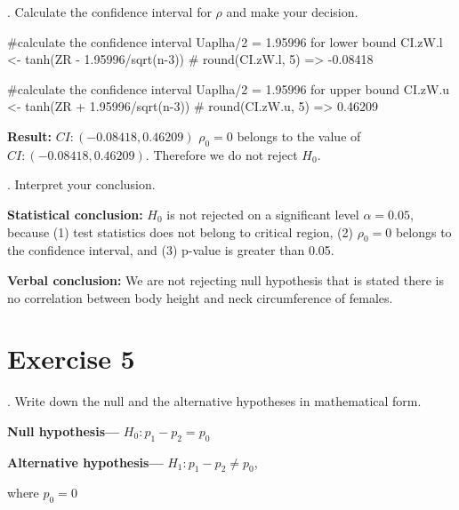 \documentclass[12pt, oneside]{report}\usepackage[]{graphicx}\usepackage[]{color}
\begin{document}
. Calculate the confidence interval for $\rho$ and make your decision.
\begin{Schunk}
\begin{Sinput}
#calculate the confidence interval Uaplha/2 = 1.95996 for lower bound
CI.zW.l <- tanh(ZR - 1.95996/sqrt(n-3))
# round(CI.zW.l, 5) => -0.08418

#calculate the confidence interval Uaplha/2 = 1.95996 for upper bound
CI.zW.u <- tanh(ZR + 1.95996/sqrt(n-3))
# round(CI.zW.u, 5) => 0.46209
\end{Sinput}
\end{Schunk}
{\bf Result:} $CI: (-0.08418, 0.46209)$ \newline
$\rho_0 = 0$ belongs to the value of $CI: (-0.08418, 0.46209)$. Therefore we do not reject $H_0$. \newline

. Interpret your conclusion. \newline

{\bf Statistical conclusion:} \newline
$H_0$ is not rejected on a significant level $\alpha = 0.05$, because (1) test statistics does not belong to critical region, (2) $\rho_0 = 0$ belongs to the confidence interval, and (3) p-value is greater than 0.05. \newline 

{\bf Verbal conclusion:} \newline
We are not rejecting null hypothesis that is stated there is no correlation between body height and neck circumference of females. \newline

\section*{Exercise 5}
. Write down the null and the alternative hypotheses in mathematical form. \newline

{\bf Null hypothesis—} $H_0: p_1 - p_2 = p_0$ \newline

{\bf Alternative hypothesis—} $H_1: p_1 - p_2 \neq p_0$, \newline

where $p_0 = 0$\newline
\end{document}
